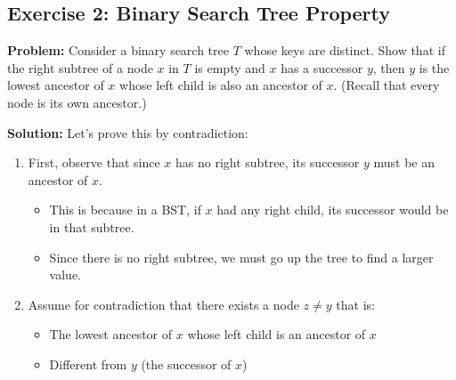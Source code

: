 \FloatBarrier

\subsection{Exercise 2: Binary Search Tree Property}

\textbf{Problem:} Consider a binary search tree $T$ whose keys are distinct. Show that if the right subtree of a node $x$ in $T$ is empty and $x$ has a successor $y$, then $y$ is the lowest ancestor of $x$ whose left child is also an ancestor of $x$. (Recall that every node is its own ancestor.)

\textbf{Solution:} Let's prove this by contradiction:

\begin{enumerate}
    \item First, observe that since $x$ has no right subtree, its successor $y$ must be an ancestor of $x$.
        \begin{itemize}
            \item This is because in a BST, if $x$ had any right child, its successor would be in that subtree.
            \item Since there is no right subtree, we must go up the tree to find a larger value.
        \end{itemize}
    
    \item Assume for contradiction that there exists a node $z \neq y$ that is:
        \begin{itemize}
            \item The lowest ancestor of $x$ whose left child is an ancestor of $x$
            \item Different from $y$ (the successor of $x$)
        \end{itemize}
\end{enumerate}

